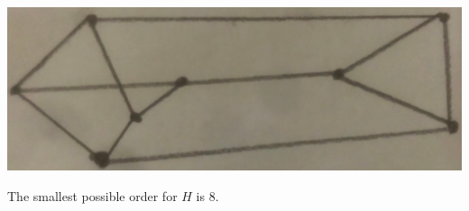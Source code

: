 \documentclass[12pt]{article}
\begin{document}
\bigskip
{}


\begin{center}
\includegraphics[scale=.05]{image_67126017.JPG}
\end{center}

\medskip
{} The smallest possible order for $H$ is 8.
\end{document}
